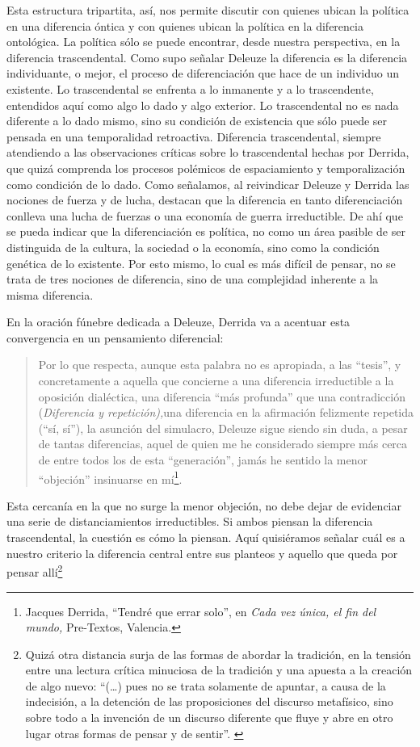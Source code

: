 Esta estructura tripartita, así, nos permite discutir con quienes ubican la política en una diferencia óntica y con quienes ubican la política en la diferencia ontológica. La política sólo se puede encontrar, desde nuestra perspectiva, en la diferencia trascendental. Como supo señalar Deleuze la diferencia es la diferencia individuante, o mejor, el proceso de diferenciación que hace de un individuo un existente. Lo trascendental se enfrenta a lo inmanente y a lo trascendente, entendidos aquí como algo lo dado y algo exterior. Lo trascendental no es nada diferente a lo dado mismo, sino su condición de existencia que sólo puede ser pensada en una temporalidad retroactiva. Diferencia trascendental, siempre atendiendo a las observaciones críticas sobre lo trascendental hechas por Derrida, que quizá comprenda los procesos polémicos de espaciamiento y temporalización como condición de lo dado. Como señalamos, al reivindicar Deleuze y Derrida las nociones de fuerza y de lucha, destacan que la diferencia en tanto diferenciación conlleva una lucha de fuerzas o una economía de guerra irreductible. De ahí que se pueda indicar que la diferenciación es política, no como un área pasible de ser distinguida de la cultura, la sociedad o la economía, sino como la condición genética  de lo existente. Por esto mismo, lo cual es más difícil de pensar, no se trata de tres nociones de diferencia, sino de una complejidad inherente a la misma diferencia.

En la oración fúnebre dedicada a Deleuze, Derrida va a acentuar esta convergencia en un pensamiento diferencial:

\begin{quote}
Por lo que respecta, aunque esta palabra no es apropiada, a las \enquote{tesis}, y concretamente a aquella que concierne a una diferencia irreductible a la oposición dialéctica, una diferencia \enquote{más profunda} que una contradicción (\emph{Diferencia y repetición),}una diferencia en la afirmación felizmente repetida (\enquote{sí, sí}), la asunción del simulacro, Deleuze sigue siendo sin duda, a pesar de tantas diferencias, aquel de quien me he considerado siempre más cerca de entre todos los de esta \enquote{generación}, jamás he sentido la menor \enquote{objeción} insinuarse en mí\footnote{Jacques Derrida, \enquote{Tendré que errar solo}, en \emph{Cada vez única, el fin del mundo,} Pre-Textos, Valencia.}.
\end{quote}

Esta cercanía en la que no surge la menor objeción, no debe dejar de evidenciar una serie de distanciamientos irreductibles. Si ambos piensan la diferencia trascendental, la cuestión es cómo la piensan. Aquí quisiéramos señalar cuál es a nuestro criterio la diferencia central entre sus planteos y aquello que queda por pensar allí\footnote{Quizá otra distancia surja de las formas de abordar la tradición, en la tensión entre una lectura crítica minuciosa de la tradición y una apuesta a la creación de algo nuevo: \enquote{(\dots) pues no se trata solamente de apuntar, a causa de la indecisión, a la detención de las proposiciones del discurso metafísico, sino sobre todo a la invención de un discurso diferente que fluye y abre en otro lugar otras formas de pensar y de sentir}. \cite[114]{@6985-MENGUE2008}}

